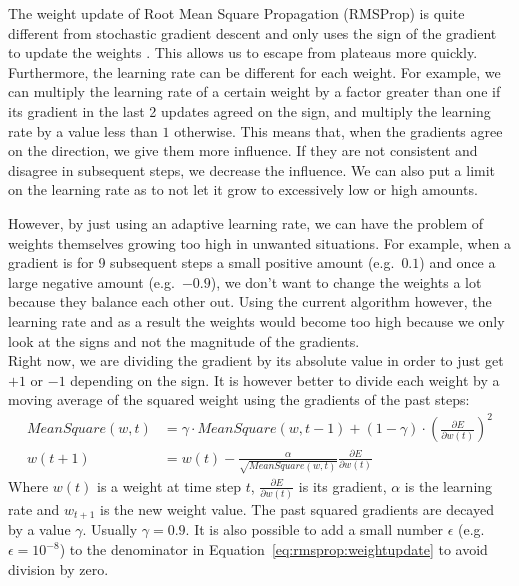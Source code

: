 The weight update of Root Mean Square Propagation (RMSProp) is quite different from stochastic gradient descent and only uses the sign of the gradient to update the weights \parencite{Tieleman2012LectureMagnitude.}.
This allows us to escape from plateaus more quickly. Furthermore, the learning rate can be different for each weight.
For example, we can multiply the learning rate of a certain weight by a factor greater than one if its gradient in the last 2 updates agreed on the sign, and multiply the learning rate by a value less than $1$ otherwise.
This means that, when the gradients agree on the direction, we give them more influence.
If they are not consistent and disagree in subsequent steps, we decrease the influence. We can also put a limit on the learning rate as to not let it grow to excessively low or high amounts.

However, by just using an adaptive learning rate, we can have the problem of weights themselves growing too high in unwanted situations. For example, when a gradient is for 9 subsequent steps a small positive amount (e.g.\ $0.1$) and once a large negative amount (e.g.\ $-0.9$), we don't want to change the weights a lot because they balance each other out.
Using the current algorithm however, the learning rate and as a result the weights would become too high because we only look at the signs and not the magnitude of the gradients.\\
Right now, we are dividing the gradient by its absolute value in order to just get $+1$ or $-1$ depending on the sign. It is however better to divide each weight by a moving average of the squared weight using the gradients of the past steps:
\begin{subequations}
\label{eq:rmsprop}
\begin{align}
MeanSquare(w, t) &= \gamma \cdot MeanSquare(w, t-1) + (1 - \gamma) \cdot \left (\frac{\partial E}{\partial w(t)} \right )^2 \\
w(t+1) &= w(t) - \frac{\alpha}{\sqrt{MeanSquare(w,t)}}\frac{\partial E}{\partial w(t)} \label{eq:rmsprop:weightupdate}
\end{align}
\end{subequations}
Where $w(t)$ is a weight at time step $t$, $\frac{\partial E}{\partial w(t)}$ is its gradient, $\alpha$ is the learning rate and $w_{t+1}$ is the new weight value. The past squared gradients are decayed by a value $\gamma$. Usually $\gamma=0.9$. It is also possible to add a small number $\epsilon$ (e.g.\ $\epsilon = 10^{-8}$) to the denominator in Equation~\ref{eq:rmsprop:weightupdate} to avoid division by zero.\\

